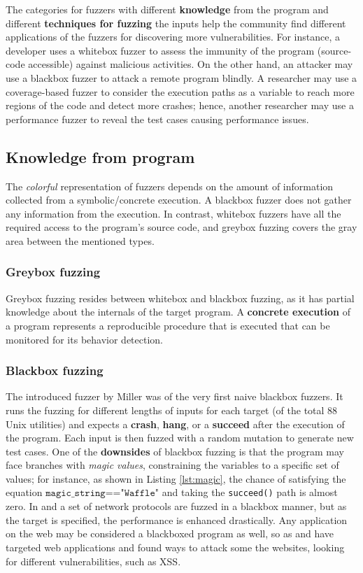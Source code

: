 The categories for fuzzers with different \textbf{knowledge} from the program and different \textbf{techniques for fuzzing} the inputs help the community find different applications of the fuzzers for discovering more vulnerabilities. For instance, a developer uses a whitebox fuzzer to assess the immunity of the program (source-code accessible) against malicious activities. On the other hand, an attacker may use a blackbox fuzzer to attack a remote program blindly. A researcher may use a coverage-based fuzzer to consider the execution paths as a variable to reach more regions of the code and detect more crashes; hence, another researcher may use a performance fuzzer to reveal the test cases causing performance issues. 

\subsection{Knowledge from program}

The \textit{colorful} representation of fuzzers depends on the amount of information collected from a symbolic/concrete execution. A blackbox fuzzer does not gather any information from the execution. In contrast, whitebox fuzzers have all the required access to the program's source code, and greybox fuzzing covers the gray area between the mentioned types.

\subsubsection{Greybox fuzzing}

Greybox fuzzing resides between whitebox and blackbox fuzzing, as it has partial knowledge about the internals of the target program. A \textbf{concrete execution} of a program represents a reproducible procedure that is executed that can be monitored for its behavior detection.

\subsubsection{Blackbox fuzzing}
The introduced fuzzer by Miller \cite{miller1990empirical} was of the very first naive blackbox fuzzers. It runs the fuzzing for different lengths of inputs for each target (of the total 88 Unix utilities) and expects a \textbf{crash}, \textbf{hang}, or a \textbf{succeed} after the execution of the program. Each input is then fuzzed with a random mutation to generate new test cases. One of the \textbf{downsides} of blackbox fuzzing is that the program may face branches with \textit{magic values}, constraining the variables to a specific set of values; for instance, as shown in Listing \ref{lst:magic}, the chance of satisfying the equation $\texttt{magic\_string=="Waffle"}$ and taking the \texttt{succeed()} path is almost zero. In \cite{banks2006snooze} and \cite{gascon2015pulsar} a set of network protocols are fuzzed in a blackbox manner, but as the target is specified, the performance is enhanced drastically. Any application on the web may be considered a blackboxed program as well, so as \cite{doupe2012enemy} and \cite{duchene2012xss} have targeted web applications and found ways to attack some the websites, looking for different vulnerabilities, such as XSS.

